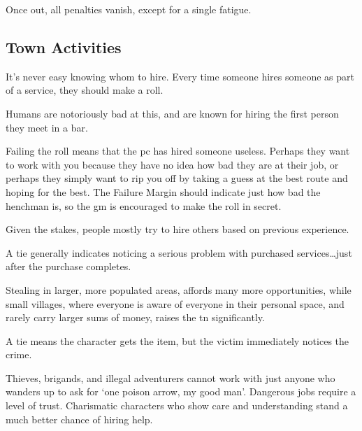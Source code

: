 \begin{multicols}{2}
Once out, all penalties vanish, except for a single \gls{fatigue}.

\subsection{Town Activities}

It's never easy knowing whom to hire.
Every time someone hires someone as part of a service, they should make a roll.

Humans are notoriously bad at this, and are known for hiring the first person they meet in a bar.

Failing the roll means that the \gls{pc} has hired someone useless.
Perhaps they want to work with you because they have no idea how bad they are at their job, or perhaps they simply want to rip you off by taking a guess at the best route and hoping for the best.
The Failure Margin should indicate just how bad the henchman is, so the \gls{gm} is encouraged to make the roll in secret.

Given the stakes, people mostly try to hire others based on previous experience.

A tie generally indicates noticing a serious problem with purchased services\ldots just after the purchase completes.

Stealing in larger, more populated areas, affords many more opportunities, while small \glspl{village}, where everyone is aware of everyone in their personal space, and rarely carry larger sums of money, raises the \gls{tn} significantly.


A tie means the character gets the item, but the victim immediately notices the crime.

\larcenyChart

Thieves, brigands, and illegal adventurers cannot work with just anyone who wanders up to ask for `one poison arrow, my good man'.
Dangerous jobs require a level of trust.
Charismatic characters who show care and understanding stand a much better chance of hiring help.

\end{multicols}
